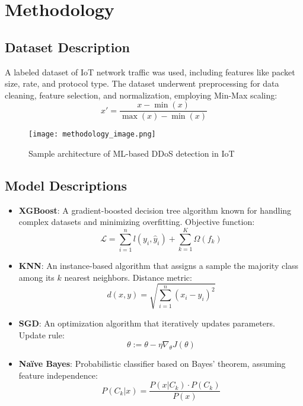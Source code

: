 \documentclass[conference]{IEEEtran}
\begin{document}
\section{Methodology}

\subsection{Dataset Description}
A labeled dataset of IoT network traffic was used, including features like packet size, rate, and protocol type. The dataset underwent preprocessing for data cleaning, feature selection, and normalization, employing Min-Max scaling:
\begin{equation}
    x' = \frac{x - \min(x)}{\max(x) - \min(x)}
\end{equation}

\begin{figure}[htbp]
\centerline{\texttt{[image: methodology\_image.png]}}
\caption{Sample architecture of ML-based DDoS detection in IoT}
\label{fig:methodology}
\end{figure}

\subsection{Model Descriptions}
\begin{itemize}
    \item \textbf{XGBoost}: A gradient-boosted decision tree algorithm known for handling complex datasets and minimizing overfitting. Objective function:
    \begin{equation}
        \mathcal{L} = \sum_{i=1}^{n} l(y_i, \hat{y}_i) + \sum_{k=1}^{K} \Omega(f_k)
    \end{equation}

    \item \textbf{KNN}: An instance-based algorithm that assigns a sample the majority class among its \( k \) nearest neighbors. Distance metric:
    \begin{equation}
        d(x, y) = \sqrt{\sum_{i=1}^{n} (x_i - y_i)^2}
    \end{equation}

    \item \textbf{SGD}: An optimization algorithm that iteratively updates parameters. Update rule:
    \begin{equation}
        \theta := \theta - \eta \nabla_\theta J(\theta)
    \end{equation}

    \item \textbf{Naïve Bayes}: Probabilistic classifier based on Bayes' theorem, assuming feature independence:
    \begin{equation}
        P(C_k | x) = \frac{P(x | C_k) \cdot P(C_k)}{P(x)}
    \end{equation}
\end{itemize}
\end{document}
